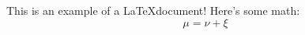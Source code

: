 \documentclass{article}
\begin{document}
This is an example of a \LaTeX document! Here's some math: $$\mu = \nu + \xi$$
\end{document}
